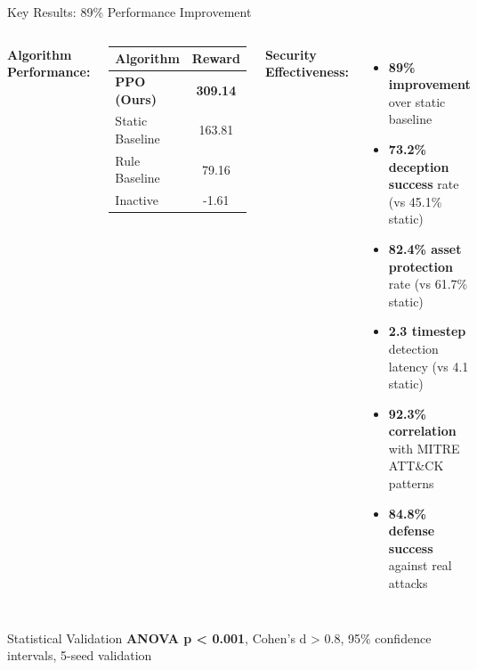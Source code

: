 \documentclass[aspectratio=169,xcolor=dvipsnames]{beamer}
\begin{document}
\begin{frame}{Key Results: 89\% Performance Improvement}
\begin{columns}[c]
\textbf{\textcolor{ImperialBlue}{Algorithm Performance:}}

\begin{center}
\begin{tabular}{|l|c|}
\hline
\rowcolor{ImperialLightBlue}
\textbf{Algorithm} & \textbf{Reward} \\
\hline
\rowcolor{green!20}
\textbf{PPO (Ours)} & \textbf{309.14} \\
Static Baseline & 163.81 \\
Rule Baseline & 79.16 \\
Inactive & -1.61 \\
\hline
\end{tabular}
\end{center}

\textbf{\textcolor{cwAlert}{Security Effectiveness:}}
\begin{itemize}
    \item \textbf{\textcolor{cwAlert}{89\% improvement}} over static baseline
    \item \textbf{73.2\% deception success} rate (vs 45.1\% static)
    \item \textbf{82.4\% asset protection} rate (vs 61.7\% static)
    \item \textbf{2.3 timestep} detection latency (vs 4.1 static)
    \item \textbf{92.3\% correlation} with MITRE ATT\&CK patterns
    \item \textbf{84.8\% defense success} against real attacks
\end{itemize}
\end{columns}

\vspace{0.3cm}
\begin{exampleblock}{Statistical Validation}
\textbf{ANOVA p < 0.001}, Cohen's d > 0.8, 95\% confidence intervals, 5-seed validation
\end{exampleblock}
\end{frame}
\end{document}
